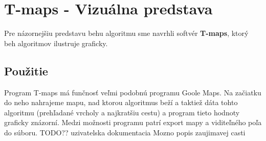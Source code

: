 \chapter{T-maps - Vizuálna predstava}

Pre názornejšiu predstavu behu algoritmu sme navrhli softvér \textbf{T-maps}, ktorý beh algoritmov ilustruje graficky.

\section{Použitie}

Program T-maps má funčnosť veľmi podobnú programu Goole Maps. Na začiatku do neho nahrajeme mapu, nad ktorou algoritmus beží a taktiež dáta
tohto algoritmu (prehľadané vrcholy a najkratšiu cestu) a program tieto hodnoty graficky znázorní.
Medzi možnosti programu patrí export mapy a viditeľného poľa do súboru.
 TODO??  uzivatelska dokumentacia
Mozno popis zaujimavej casti  

